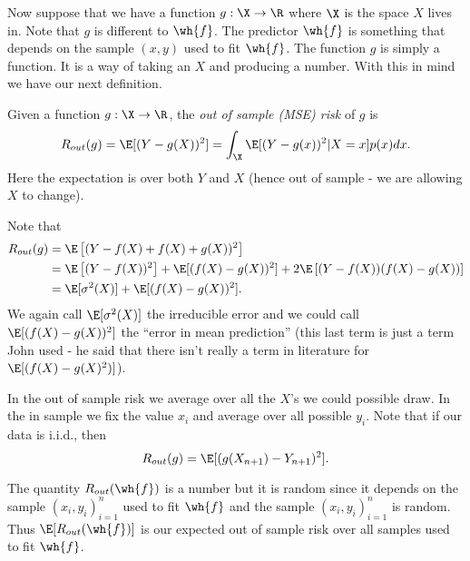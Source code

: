 Now suppose that we have a function $g:\X \to \R$ where $\X$ is the space $X$ lives in. Note that $g$ is different to $\wh{f}$. The predictor $\wh{f}$ is something that depends on the sample $(x,y)$ used to fit $\wh{f}$. The function $g$ is simply a function. It is a way of taking an $X$ and producing a number. With this in mind we have our next definition.
\begin{defn}
    Given a function $g : \X \to \R$, the \emph{out of sample (MSE) risk} of $g$ is
    \[R_{out}(g) = \E[(Y-g(X))^2] = \int_\X \E[(Y-g(x))^2|X=x]p(x)dx. \]
    Here the expectation is over both $Y$ and $X$ (hence out of sample - we are allowing $X$ to change).
\end{defn}
Note that 
\begin{align*}
    R_{out}(g) &= \E\left[(Y-f(X)+f(X)+g(X))^2\right]\\
&=\E\left[(Y-f(X))^2\right]+\E[(f(X)-g(X))^2]+2\E\left[(Y-f(X))(f(X)-g(X))\right]\\
&=\E[\sigma^2(X)]+\E[(f(X)-g(X))^2].
\end{align*}
We again call $\E[\sigma^2(X)]$ the irreducible error and we could call $\E[(f(X)-g(X))^2]$ the ``error in mean prediction'' (this last term is just a term John used - he said that there isn't really a term in literature for $\E[(f(X)-g(X)^2)]$).

In the out of sample risk we average over all the $X$'s we could possible draw. In the in sample we fix the value $x_i$ and average over all possible $y_i$. Note that if our data is i.i.d., then 
\[R_{out}(g) = \E[(g(X_{n+1})-Y_{n+1})^2]. \]

 The quantity $R_{out}(\wh{f})$ is a number but it is random since it depends on the sample $(x_i,y_i)_{i=1}^n$ used to fit $\wh{f}$ and the sample $(x_i,y_i)_{i=1}^n$ is random. Thus $\E[R_{out}(\wh{f})]$ is our expected out of sample risk over all samples used to fit $\wh{f}$.
 
